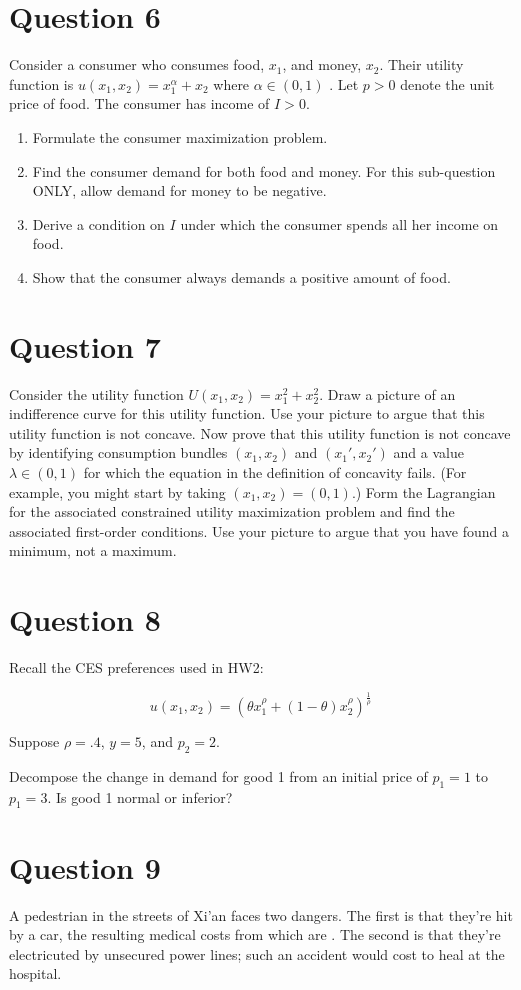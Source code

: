 \documentclass{article}
\begin{document}
\section*{Question 6}
Consider a consumer who consumes food, $x_1$, and money, $x_2$. Their utility function is $u(x_1, x_2) = x_1^{\alpha} + x_2$ where $\alpha\in(0,1)$ . Let $p>0$ denote the unit price of food. The consumer has income of $I>0$.
\begin{enumerate}
\item  Formulate the consumer maximization problem.
\item  Find the consumer demand for both food and money. For this sub-question ONLY, allow demand for money to be negative.
\item Derive a condition on $I$ under which the consumer spends
all her income on food.
\item Show that the consumer
always demands a positive amount of food.
\end{enumerate}

\section*{Question 7}
Consider the utility function $U(x_1,x_2)=x_1^2+x_2^2$.  Draw a picture of an indifference curve for this utility function.  Use your picture to argue that this utility function is not concave.  Now prove that this utility function is not concave by identifying consumption bundles $(x_1,x_2)$ and $(x_1',x_2')$ and a value $\lambda\in(0,1)$ for which the equation in the definition of concavity fails.  (For example, you might start by taking $(x_1,x_2)=(0,1)$.)  Form the Lagrangian for the associated constrained utility maximization problem and find the associated first-order conditions.  Use your picture to argue that you have found a minimum, not a maximum.

\section*{Question 8}
Recall the CES preferences used in HW2:

\[
u(x_1, x_2) = \left(\theta x_1^{\rho} + (1-\theta) x_2^{\rho}\right)^{\frac1{\rho}}
\]

Suppose $\rho = .4$, $y = 5$, and $p_2 = 2$.

Decompose the change in demand for good 1 from an initial price of $p_1 = 1$ to $p_1 = 3$. Is good 1 normal or inferior?

\section*{Question 9}
A pedestrian in the streets of Xi'an faces two dangers. The first is that they're hit by a car, the resulting medical costs from which are . The second is that they're electricuted by unsecured power lines; such an accident would cost  to heal at the hospital.
\end{document}
